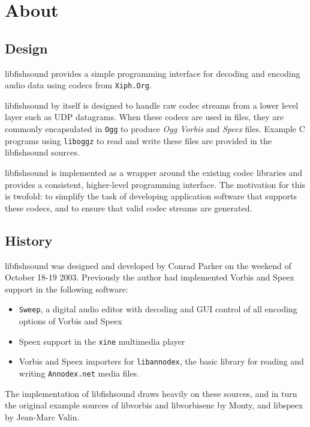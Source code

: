 \section{About}
\label{group__about}
\subsection{Design}\label{design}
libfishsound provides a simple programming interface for decoding and encoding audio data using codecs from {\tt Xiph.Org}.

libfishsound by itself is designed to handle raw codec streams from a lower level layer such as UDP datagrams. When these codecs are used in files, they are commonly encapsulated in {\tt Ogg} to produce {\em Ogg Vorbis\/} and {\em Speex\/} files. Example C programs using {\tt liboggz} to read and write these files are provided in the libfishsound sources.

libfishsound is implemented as a wrapper around the existing codec libraries and provides a consistent, higher-level programming interface. The motivation for this is twofold: to simplify the task of developing application software that supports these codecs, and to ensure that valid codec streams are generated.\subsection{History}\label{history}
libfishsound was designed and developed by Conrad Parker on the weekend of October 18-19 2003. Previously the author had implemented Vorbis and Speex support in the following software:\begin{itemize}
\item {\tt Sweep}, a digital audio editor with decoding and GUI control of all encoding options of Vorbis and Speex\item Speex support in the {\tt xine} multimedia player\item Vorbis and Speex importers for {\tt libannodex}, the basic library for reading and writing {\tt Annodex.net} media files.\end{itemize}


The implementation of libfishsound draws heavily on these sources, and in turn the original example sources of libvorbis and libvorbisenc by Monty, and libspeex by Jean-Marc Valin.

